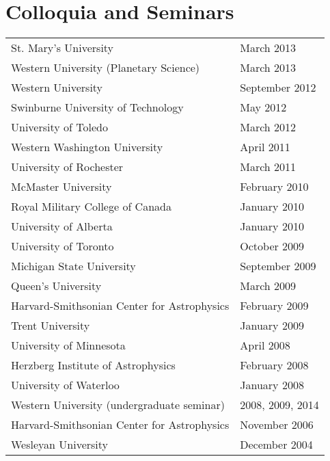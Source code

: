 \documentclass[12pt]{article}
\begin{document}
\section{Colloquia and Seminars}
\begin{tabular}{p{12cm}l}
St. Mary's University& March 2013\\ %
Western University (Planetary Science)& March 2013\\ %
Western University& September 2012\\ %
Swinburne University of Technology& May 2012\\  %
University of Toledo& March 2012\\ %
Western Washington University& April 2011\\ %
University of Rochester& March 2011\\ %
McMaster University&  February 2010\\ %
Royal Military College of Canada& January 2010\\ %
University of Alberta& January 2010\\ %
University of Toronto&  October 2009\\%
Michigan State University& September 2009\\%
Queen's University& March 2009\\ %
Harvard-Smithsonian Center for Astrophysics& February 2009\\ %
Trent University& January 2009\\ %
University of Minnesota& April 2008\\ %
Herzberg Institute of Astrophysics& February 2008\\ %
University of Waterloo& January 2008\\ %
Western University (undergraduate seminar)& 2008, 2009, 2014\\
Harvard-Smithsonian Center for Astrophysics& November 2006\\
Wesleyan University& December 2004\\

\end{tabular}
\end{document}
